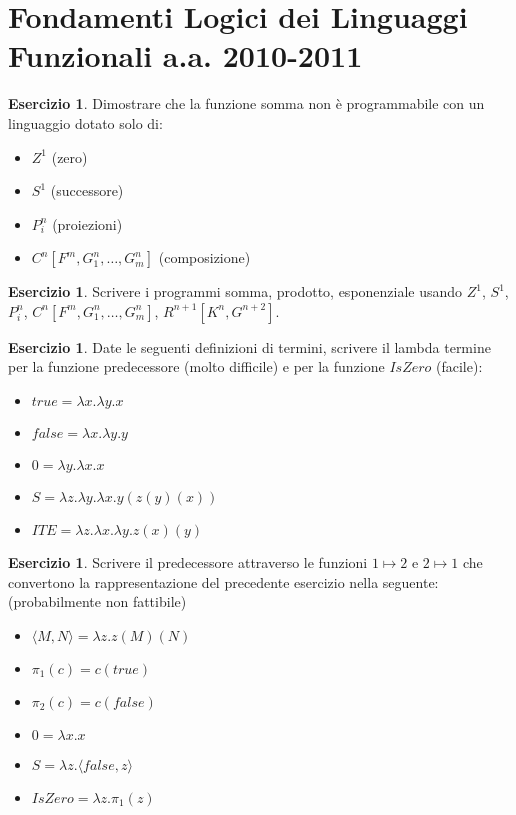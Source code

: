 \documentclass[oneside]{amsart}
\numberwithin{equation}{section}
\numberwithin{figure}{section}
\theoremstyle{plain}
\theoremstyle{definition}
\newtheorem{xca}[thm]{Esercizio}
\begin{document}
\section*{Fondamenti Logici dei Linguaggi Funzionali a.a. 2010-2011}

\begin{xca}
Dimostrare che la funzione somma non è programmabile con un linguaggio dotato solo di:
\begin{itemize}
\item $Z^{1}$ (zero)
\item $S^{1}$ (successore)
\item $P_{i}^{n}$ (proiezioni)
\item $C^{n}[F^{m}, G_{1}^{n}, \ldots, G_{m}^{n}]$ (composizione)
\end{itemize}
\end{xca}

\begin{xca}
Scrivere i programmi somma, prodotto, esponenziale usando $Z^{1}$, $S^{1}$, $P_{i}^{n}$,
$C^{n}[F^{m}, G_{1}^{n}, \ldots, G_{m}^{n}]$, $R^{n+1}[K^{n}, G^{n+2}]$.
\end{xca}

\begin{xca}
Date le seguenti definizioni di termini, scrivere il lambda termine
per la funzione predecessore (molto difficile) e per la funzione $IsZero$ (facile):
\begin{itemize}
\item $true = \lambda x.\lambda y.x $
\item $false = \lambda x.\lambda y.y $
\item $0 = \lambda y.\lambda x.x $
\item $S = \lambda z.\lambda y.\lambda x.y(z(y)(x)) $
\item $ITE = \lambda z.\lambda x.\lambda y.z(x)(y)$
\end{itemize}
\end{xca}

\begin{xca}
Scrivere il predecessore attraverso le funzioni $1 \mapsto 2$ e $2 \mapsto 1$ che
convertono la rappresentazione del precedente esercizio nella seguente: (probabilmente
non fattibile)
\begin{itemize}
\item $\langle M,N\rangle={\lambda}z.z(M)(N)$
\item $\pi_{1}(c)=c(true)$
\item $\pi_{2}(c)=c(false)$
\item $0={\lambda}x.x$
\item $S={\lambda}z.\langle false,z\rangle$
\item $IsZero={\lambda}z.\pi_{1}(z)$
\end{itemize}
\end{xca}
\end{document}
